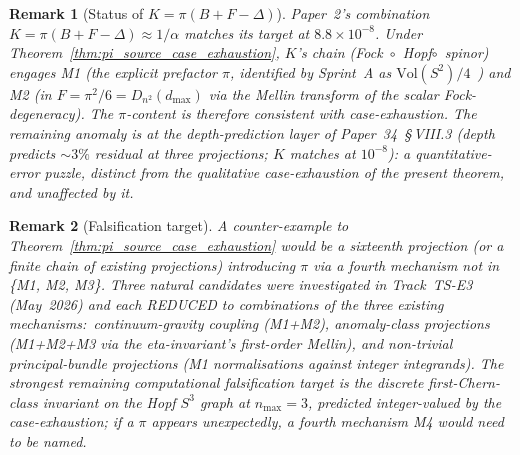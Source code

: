 \documentclass[11pt]{article}
\newtheorem{remark}{Remark}
\begin{document}
\begin{remark}[Status of $K = \pi(B + F - \Delta)$]
\label{rem:K_under_theorem}
Paper~2's combination $K = \pi(B+F-\Delta) \approx 1/\alpha$ matches
its target at $8.8 \times 10^{-8}$.  Under
Theorem~\ref{thm:pi_source_case_exhaustion}, $K$'s chain
(Fock~$\circ$~Hopf$\circ$~spinor) engages M1 (the explicit prefactor $\pi$,
identified by Sprint~A as $\mathrm{Vol}(S^2)/4$~\cite{paper2}) and M2
(in $F = \pi^2/6 = D_{n^2}(d_{\max})$ via the Mellin transform of
the scalar Fock-degeneracy).  The $\pi$-content is therefore consistent
with case-exhaustion.  The remaining anomaly is at the
\emph{depth-prediction} layer of Paper~34~\S\,VIII.3 (depth predicts
$\sim 3\%$ residual at three projections; $K$ matches at
$10^{-8}$): a quantitative-error puzzle, distinct from the
qualitative case-exhaustion of the present theorem, and
unaffected by it.
\end{remark}

\begin{remark}[Falsification target]
A counter-example to Theorem~\ref{thm:pi_source_case_exhaustion}
would be a sixteenth projection (or a finite chain of existing
projections) introducing $\pi$ via a fourth mechanism not in
\{M1, M2, M3\}.  Three natural candidates were investigated in
Track~TS-E3 (May~2026) and each REDUCED to combinations of the
three existing mechanisms:\ continuum-gravity coupling (M1+M2),
anomaly-class projections (M1+M2+M3 via the eta-invariant's
first-order Mellin), and non-trivial principal-bundle projections
(M1 normalisations against integer integrands).  The strongest
remaining computational falsification target is the discrete
first-Chern-class invariant on the Hopf $S^3$ graph at $n_{\max}=3$,
predicted integer-valued by the case-exhaustion; if a $\pi$ appears
unexpectedly, a fourth mechanism M4 would need to be named.
\end{remark}
\end{document}
